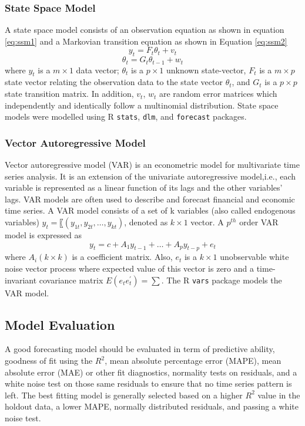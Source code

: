 \subsubsection{State Space Model}
A state space model consists of an observation equation as shown in equation \ref{eq:ssm1} and a Markovian transition equation as shown in Equation \ref{eq:ssm2} 
\begin{equation}
y_t=F_t \theta_t +v_t
\label{eq:ssm1}
\end{equation}
\begin{equation}
\theta_t=G_t\theta_{t-1} + w_t
\label{eq:ssm2}
\end{equation}
where $y_t$ is a $m \times 1$ data vector; $\theta_t$  is a $p\times1$ unknown state-vector, $F_t$ is a $m\times p$ state vector relating the observation data to the state vector $\theta_t$, and $G_t$ is a $p\times p$ state transition matrix. In addition, $v_t$, $w_t$ are random error matrices which independently and identically follow a multinomial distribution. State space models were modelled using R {\tt stats}, {\tt dlm}, and {\tt forecast} packages. 

\subsubsection{Vector Autoregressive Model}
Vector autoregressive model (VAR) is an econometric model for multivariate time series analysis. It is an extension of the univariate autoregressive model,i.e., each variable is represented as a linear function of its lags and the other variables' lags. VAR models are often used to describe and forecast financial and economic time series. A VAR model consists of a set of k variables (also called endogenous variables) $y_t=〖(y_{1t}, y_{2t}, \dots, y_{kt})$, denoted as $k\times1$ vector. A $p^{th}$ order VAR model is expressed as 
\begin{equation}
y_t=c+A_1y_{t-1}+\dots +A_py_{t-p}+e_t
\end{equation}
where $A_i(k \times k)$ is a coefficient matrix. Also, $e_t$  is a $k \times 1$ unobservable white noise vector process where expected value of this vector is zero and a time-invariant covariance matrix $E(e_t e_t^{'})=\sum$. The R {\tt vars} package models the VAR model.
\subsection{Model Evaluation}
A good forecasting model should be evaluated in term of predictive ability, goodness of fit using the $R^2$, mean absolute percentage error (MAPE), mean absolute error (MAE) or other fit diagnostics, normality tests on residuals, and a white noise test on those same residuals to ensure that no time series pattern is left. The best fitting model is generally selected based on a higher $R^2$ value in the holdout data, a lower MAPE, normally distributed residuals, and passing a white noise test. 

